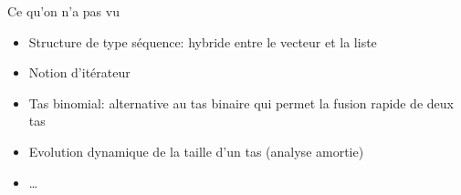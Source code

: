 \begin{frame}{Ce qu'on n'a pas vu}

\begin{itemize}
\item Structure de type séquence: hybride entre le vecteur et la
  liste
\item Notion d'itérateur
\item Tas binomial: alternative au tas binaire qui permet la fusion
  rapide de deux tas
\item Evolution dynamique de la taille d'un tas (analyse amortie)
\item \ldots
\end{itemize}

\end{frame}
